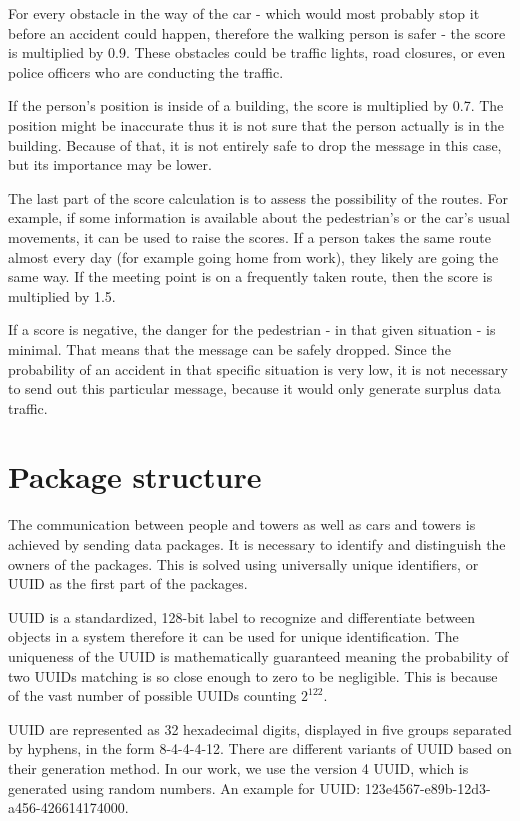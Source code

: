 \documentclass[conference]{IEEEtran}
\begin{document}
For every obstacle in the way of the car - which would most probably stop it before an accident could happen, therefore the walking person is safer - the score is multiplied by 0.9. These obstacles could be traffic lights, road closures, or even police officers who are conducting the traffic.

If the person’s position is inside of a building, the score is multiplied by 0.7. The position might be inaccurate thus it is not sure that the person actually is in the building. Because of that, it is not entirely safe to drop the message in this case, but its importance may be lower.

The last part of the score calculation is to assess the possibility of the routes. For example, if some information is available about the pedestrian's or the car's usual movements, it can be used to raise the scores. If a person takes the same route almost every day (for example going home from work), they likely are going the same way. If the meeting point is on a frequently taken route, then the score is multiplied by 1.5.

If a score is negative, the danger for the pedestrian - in that given situation - is minimal. That means that the message can be safely dropped. Since the probability of an accident in that specific situation is very low, it is not necessary to send out this particular message, because it would only generate surplus data traffic.

\section{Package structure}

The communication between people and towers as well as cars and towers is achieved by sending data packages. It is necessary to identify and distinguish the owners of the packages. This is solved using universally unique identifiers, or UUID as the first part of the packages.

UUID is a standardized, 128-bit label to recognize and differentiate between objects in a system therefore it can be used for unique identification. The uniqueness of the UUID is mathematically guaranteed meaning the probability of two UUIDs matching is so close enough to zero to be negligible. This is because of the vast number of possible UUIDs counting $2^{122}$.

UUID are represented as 32 hexadecimal digits, displayed in five groups separated by hyphens, in the form 8-4-4-4-12. There are different variants of UUID based on their generation method. In our work, we use the version 4 UUID, which is generated using random numbers. An example for UUID: 123e4567-e89b-12d3-a456-426614174000.
\end{document}
